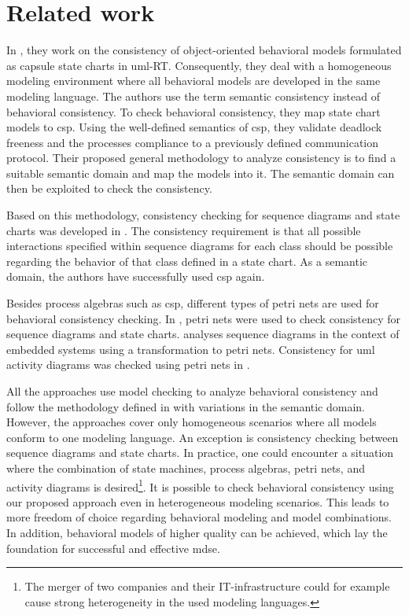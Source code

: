 \documentclass[conference]{IEEEtran}
\begin{document}
\section{Related work}
In \cite{engelsMethodologySpecifyingAnalyzing2001}, they work on the consistency of object-oriented behavioral models formulated as capsule state charts in \gls{uml}-RT.
Consequently, they deal with a homogeneous modeling environment where all behavioral models are developed in the same modeling language.
The authors use the term semantic consistency instead of behavioral consistency.
To check behavioral consistency, they map state chart models to \gls{csp}.
Using the well-defined semantics of \gls{csp}, they validate deadlock freeness and the processes compliance to a previously defined communication protocol.
Their proposed general methodology to analyze consistency is to find a suitable semantic domain and map the models into it.
The semantic domain can then be exploited to check the consistency.

Based on this methodology, consistency checking for sequence diagrams and state charts was developed in \cite{kusterExplicitBehavioralConsistency2003}.
The consistency requirement is that all possible interactions specified within sequence diagrams for each class should be possible regarding the behavior of that class defined in a state chart.
As a semantic domain, the authors have successfully used \gls{csp} again.

Besides process algebras such as \gls{csp}, different types of petri nets are used for behavioral consistency checking.
In \cite{yaoConsistencyCheckingUML2006}, petri nets were used to check consistency for sequence diagrams and state charts.
\cite{cunhaFormalVerificationUML2011} analyses sequence diagrams in the context of embedded systems using a transformation to petri nets.
Consistency for \gls{uml} activity diagrams was checked using petri nets in \cite{thierry-miegUMLBehavioralConsistency2008}.

All the approaches use model checking to analyze behavioral consistency and follow the methodology defined in \cite{engelsMethodologySpecifyingAnalyzing2001} with variations in the semantic domain.
However, the approaches cover only homogeneous scenarios where all models conform to one modeling language.
An exception is consistency checking between sequence diagrams and state charts.
In practice, one could encounter a situation where the combination of state machines, process algebras, petri nets, and activity diagrams is desired\footnote{The merger of two companies and their IT-infrastructure could for example cause strong heterogeneity in the used modeling languages.}.
It is possible to check behavioral consistency using our proposed approach even in heterogeneous modeling scenarios.
This leads to more freedom of choice regarding behavioral modeling and model combinations.
In addition, behavioral models of higher quality can be achieved, which lay the foundation for successful and effective \gls{mdse}.
\end{document}
